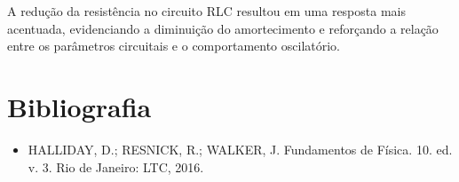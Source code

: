 \documentclass[a4 paper]{article}
\begin{document}
A redução da resistência no circuito RLC resultou em uma resposta mais acentuada, evidenciando a diminuição do amortecimento e reforçando a relação entre os parâmetros circuitais e o comportamento oscilatório. 


\vspace{30pt}
\section{Bibliografia}
\begin{itemize}
\item HALLIDAY, D.; RESNICK, R.; WALKER, J. Fundamentos de Física. 10. ed. v. 3. Rio de Janeiro: LTC, 2016.
\end{itemize}
\end{document}
